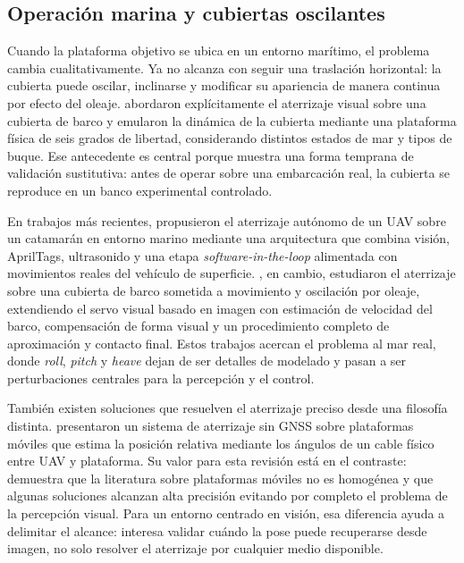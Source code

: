 \documentclass[12pt,a4paper]{report}
\begin{document}
\subsection{Operación marina y cubiertas oscilantes}

Cuando la plataforma objetivo se ubica en un entorno marítimo, el problema
cambia cualitativamente. Ya no alcanza con seguir una traslación horizontal: la
cubierta puede oscilar, inclinarse y modificar su apariencia de manera continua
por efecto del oleaje. \citet{SanchezLopez2014} abordaron explícitamente el
aterrizaje visual sobre una cubierta de barco y emularon la dinámica de la
cubierta mediante una plataforma física de seis grados de libertad,
considerando distintos estados de mar y tipos de buque. Ese antecedente es central porque muestra una forma
temprana de validación sustitutiva: antes de operar sobre una embarcación real,
la cubierta se reproduce en un banco experimental controlado.

En trabajos más recientes, \citet{Delbene2022} propusieron el aterrizaje
autónomo de un UAV sobre un catamarán en entorno marino mediante una
arquitectura que combina visión, AprilTags, ultrasonido y una etapa
\textit{software-in-the-loop} alimentada con movimientos reales del vehículo de
superficie. \citet{Cho2022}, en cambio, estudiaron el aterrizaje sobre una
cubierta de barco sometida a movimiento y oscilación por oleaje, extendiendo el
servo visual basado en imagen con estimación de velocidad del barco,
compensación de forma visual y un procedimiento completo de aproximación y
contacto final. Estos trabajos acercan el problema
al mar real, donde \textit{roll}, \textit{pitch} y \textit{heave} dejan de ser detalles de modelado y
pasan a ser perturbaciones centrales para la percepción y el control.

También existen soluciones que resuelven el aterrizaje preciso desde una
filosofía distinta. \citet{Alarcon2019} presentaron un sistema de aterrizaje
sin GNSS sobre plataformas móviles que estima la posición relativa mediante los
ángulos de un cable físico entre UAV y plataforma. Su valor para esta revisión está en el contraste:
demuestra que la literatura sobre plataformas móviles no es homogénea y que
algunas soluciones alcanzan alta precisión evitando por completo el problema de
la percepción visual. Para un entorno centrado en visión, esa diferencia
ayuda a delimitar el alcance: interesa validar cuándo la pose puede recuperarse
desde imagen, no solo resolver el aterrizaje por cualquier medio disponible.
\end{document}
